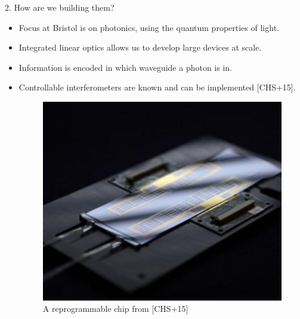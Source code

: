 \documentclass[]{templates/poster}
\begin{document}
\begin{frame}{}
\begin{columns}[t]
\begin{column}{0.422\linewidth}
  \begin{block}{\Large 2. How are we building them?}
  \begin{itemize}
  \item Focus at Bristol is on photonics, using the quantum properties of light.
  \item Integrated linear optics allows us to develop large devices at scale.
  \item Information is encoded in which waveguide a photon is in.
  \item Controllable interferometers are known and can be implemented [CHS+15].
  \begin{center}
  \begin{figure}
  \includegraphics[width=0.5\linewidth]{1E1A7349_mod-500x417}
  \caption{\label{fig:ulo} A reprogrammable chip from [CHS+15]}
  \end{figure}
  \end{center}
  \end{itemize}
  \end{block}


\end{column}
\end{columns}
\end{frame}
\end{document}
